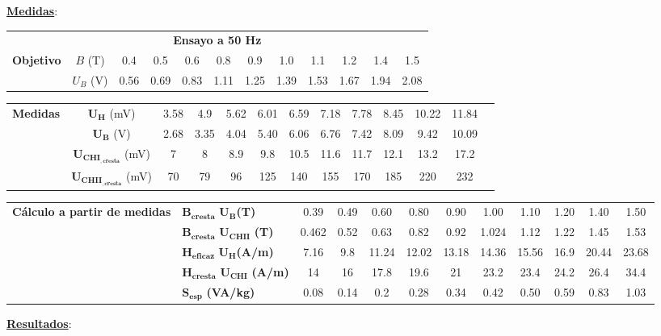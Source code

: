 \documentclass[a4paper,titlepage]{article}
\begin{document}
{\noindent\textbf{\underline{Medidas}}:
{\setlength{\arrayrulewidth}{1pt}
\begin{table}[h!]
    \flushleft
    \begin{tabular}[t]{|c|c|c|c|c|c|c|c|c|c|c|c|}
        \hline
        \multicolumn{12}{|c|}{\textbf{Ensayo a 50 Hz}} \\
        \cline{1-12}
        \multirow{2}{1.5cm}{\textbf{Objetivo}}& $B$ (T) & 0.4 & 0.5 & 0.6 & 0.8 & 0.9 & 1.0 & 1.1 & 1.2 & 1.4&1.5\\
        \cline{2-12}
        &$U_B$ (V) &0.56 &0.69&0.83 & 1.11&1.25 &1.39 &1.53 &1.67 &1.94 &2.08 \\
        \hline
    \end{tabular}
\end{table}
\begin{table}[h!]
    \centering
    \begin{tabular}[t]{|c|c|c|c|c|c|c|c|c|c|c|c|c|}
        \hline
        \multirow{4}{1.5cm}{\textbf{Medidas}}& $\mathbf{U_H}$ (mV) &3.58& 4.9&5.62& 6.01&6.59 & 7.18& 7.78 & 8.45& 10.22&11.84 \\
        \cline{2-12}
        &$\mathbf{U_B}$ (V) &2.68 &3.35 &4.04 &5.40  &6.06 &6.76 & 7.42& 8.09&  9.42& 10.09\\
        \cline{2-12}
        &$\mathbf{U_{CHI_{,cresta}}}$ (mV) &7 &8 &8.9 & 9.8 & 10.5& 11.6&11.7 &12.1 &  13.2& 17.2 \\
        \cline{2-12}
        &$\mathbf{U_{CHII_{,cresta}}}$ (mV) &70 &79 &96 &125 & 140& 155 &170 &185 &  220&232\\
        \cline{1-12}
    \end{tabular}
\end{table}
\begin{table}[h!]
    \flushleft
    \begin{tabular}[l]{|l|l|c|c|c|c|c|c|c|c|c|c|}
        \hline
        \multirow{4}{1.5cm}{\small\textbf{Cálculo a partir de medidas}}&\small $\mathbf{B_{cresta}}$ $\mathbf{U_B}$\textbf{(T)}&0.39 &0.49 &0.60 &0.80 &0.90 &1.00 & 1.10&1.20 &1.40 &1.50 \\
        \cline{2-12}
        &\small$\mathbf{B_{cresta}}$ $\mathbf{U_{CHII}}$ \textbf{(T)} &0.462 &0.52 &0.63 &0.82 &0.92 &1.024 &1.12 & 1.22&1.45 &1.53 \\
        \cline{2-12}
        &\small$\mathbf{H_{eficaz}}$ $\mathbf{U_{H}}$\textbf{(A/m)}  &7.16 &9.8 &11.24 &12.02 &13.18 &14.36 &15.56 &16.9 &20.44 &23.68 \\
        \cline{2-12}
        &\small$\mathbf{H_{cresta}}$ $\mathbf{U_{CHI}}$ \textbf{(A/m)}& 14& 16&17.8 &19.6 &21 &23.2 &23.4 &24.2 &26.4 &34.4\\
        \cline{2-12}
        &\small$\mathbf{S_{esp}}$ \textbf{(VA/kg)}& 0.08& 0.14&0.2 &0.28 &0.34 &0.42 &0.50 &0.59 &0.83 &1.03\\
        \cline{1-12}
    \end{tabular}
\end{table}
\newpage
\noindent\textbf{\underline{Resultados}}:\\

}}
\end{document}
